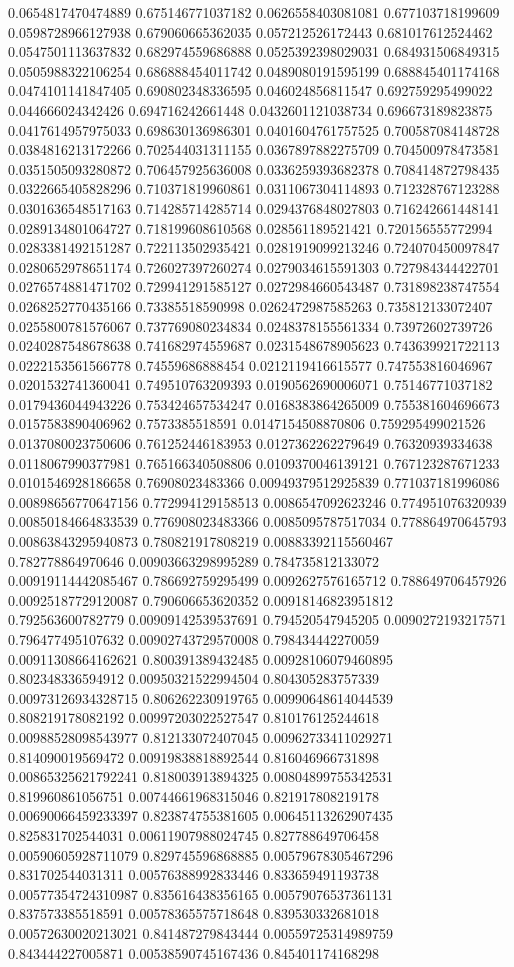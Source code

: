 \begin{table}
\begin{tabu}
\begin{sparkline}{10}
0.0654817470474889 0.675146771037182 0.0626558403081081 0.677103718199609 0.0598728966127938 0.679060665362035 0.057212526172443 0.681017612524462 0.0547501113637832 0.682974559686888 0.0525392398029031 0.684931506849315 0.0505988322106254 0.686888454011742 0.0489080191595199 0.688845401174168 0.0474101141847405 0.690802348336595 0.046024856811547 0.692759295499022 0.044666024342426 0.694716242661448 0.0432601121038734 0.696673189823875 0.0417614957975033 0.698630136986301 0.0401604761757525 0.700587084148728 0.0384816213172266 0.702544031311155 0.0367897882275709 0.704500978473581 0.0351505093280872 0.706457925636008 0.0336259393682378 0.708414872798435 0.0322665405828296 0.710371819960861 0.0311067304114893 0.712328767123288 0.0301636548517163 0.714285714285714 0.0294376848027803 0.716242661448141 0.0289134801064727 0.718199608610568 0.028561189521421 0.720156555772994 0.0283381492151287 0.722113502935421 0.0281919099213246 0.724070450097847 0.0280652978651174 0.726027397260274 0.0279034615591303 0.727984344422701 0.0276574881471702 0.729941291585127 0.0272984660543487 0.731898238747554 0.0268252770435166 0.73385518590998 0.0262472987585263 0.735812133072407 0.0255800781576067 0.737769080234834 0.0248378155561334 0.73972602739726 0.0240287548678638 0.741682974559687 0.0231548678905623 0.743639921722113 0.0222153561566778 0.74559686888454 0.0212119416615577 0.747553816046967 0.0201532741360041 0.749510763209393 0.0190562690006071 0.75146771037182 0.0179436044943226 0.753424657534247 0.0168383864265009 0.755381604696673 0.0157583890406962 0.7573385518591 0.0147154508870806 0.759295499021526 0.0137080023750606 0.761252446183953 0.0127362262279649 0.76320939334638 0.0118067990377981 0.765166340508806 0.0109370046139121 0.767123287671233 0.0101546928186658 0.76908023483366 0.00949379512925839 0.771037181996086 0.00898656770647156 0.772994129158513 0.0086547092623246 0.774951076320939 0.00850184664833539 0.776908023483366 0.0085095787517034 0.778864970645793 0.00863843295940873 0.780821917808219 0.00883392115560467 0.782778864970646 0.00903663298995289 0.784735812133072 0.00919114442085467 0.786692759295499 0.0092627576165712 0.788649706457926 0.00925187729120087 0.790606653620352 0.00918146823951812 0.792563600782779 0.00909142539537691 0.794520547945205 0.0090272193217571 0.796477495107632 0.00902743729570008 0.798434442270059 0.00911308664162621 0.800391389432485 0.00928106079460895 0.802348336594912 0.00950321522994504 0.804305283757339 0.00973126934328715 0.806262230919765 0.00990648614044539 0.808219178082192 0.00997203022527547 0.810176125244618 0.00988528098543977 0.812133072407045 0.00962733411029271 0.814090019569472 0.00919838818892544 0.816046966731898 0.00865325621792241 0.818003913894325 0.00804899755342531 0.819960861056751 0.00744661968315046 0.821917808219178 0.00690066459233397 0.823874755381605 0.00645113262907435 0.825831702544031 0.00611907988024745 0.827788649706458 0.00590605928711079 0.829745596868885 0.00579678305467296 0.831702544031311 0.00576388992833446 0.833659491193738 0.00577354724310987 0.835616438356165 0.00579076537361131 0.837573385518591 0.00578365575718648 0.839530332681018 0.00572630020213021 0.841487279843444 0.00559725314989759 0.843444227005871 0.00538590745167436 0.845401174168298 
\end{sparkline}
\end{tabu}
\end{table}
